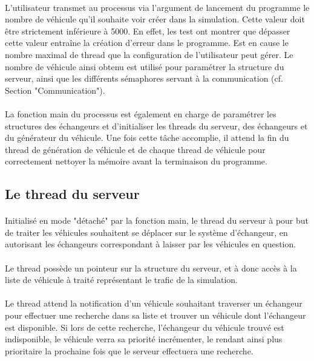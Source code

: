 \documentclass{report}
\begin{document}
	\paragraph{}	
	L'utilisateur transmet au processus via l'argument de lancement du programme le nombre de véhicule qu'il souhaite voir créer dans la simulation. Cette valeur doit être strictement inférieure à 5000. En effet, les test ont montrer que dépasser cette valeur entraîne la création d'erreur dans le programme. Est en cause le nombre maximal de thread que la configuration de l'utilisateur peut gérer.
	Le nombre de véhicule ainsi obtenu est utilisé pour paramétrer la structure du serveur, ainsi que les différents sémaphores servant à la communication (cf. Section "Communication").
	\paragraph{}
	La fonction main du processus est également en charge de paramétrer les structures des échangeurs et d'initialiser les threads du serveur, des échangeurs et du générateur du véhicule.
	Une fois cette tâche accomplie, il attend la fin du thread de génération de véhicule et de chaque thread de véhicule pour correctement nettoyer la mémoire avant la terminaison du programme.
	\subsection{Le thread du serveur}
	\paragraph{}
	Initialisé en mode "détaché" par la fonction main, le thread du serveur à pour but de traiter les véhicules souhaitent se déplacer sur le système d'échangeur, en autorisant les échangeurs correspondant à laisser par les véhicules en question.
	\paragraph{}
	Le thread possède un pointeur sur la structure du serveur, et à donc accès à la liste de véhicule à traité représentant le trafic de la simulation.
	\paragraph{}
	Le thread attend la notification d'un véhicule souhaitant traverser un échangeur pour effectuer une recherche dans sa liste et trouver un véhicule dont l'échangeur est disponible. Si lors de cette recherche, l'échangeur du véhicule trouvé est indisponible, le véhicule verra sa priorité incrémenter, le rendant ainsi plus prioritaire la prochaine fois que le serveur effectuera une recherche.
\end{document}
